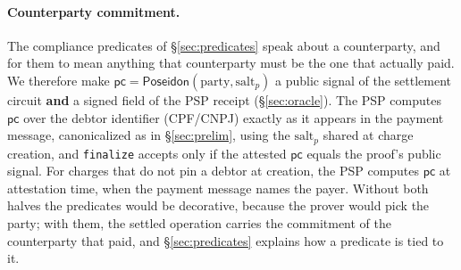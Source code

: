 \documentclass[11pt]{article}
\newcommand{\Poseidon}{\ensuremath{\mathsf{Poseidon}}}
\newcommand{\code}[1]{\texttt{#1}}
\begin{document}
\paragraph{Counterparty commitment.}
The compliance predicates of \S\ref{sec:predicates} speak about a counterparty,
and for them to mean anything that counterparty must be the one that actually
paid. We therefore make $\mathsf{pc}=\Poseidon(\text{party},\text{salt}_p)$ a
public signal of the settlement circuit \textbf{and} a signed field of the PSP
receipt (\S\ref{sec:oracle}). The PSP computes $\mathsf{pc}$ over the debtor
identifier (CPF/CNPJ) exactly as it appears in the payment message,
canonicalized as in \S\ref{sec:prelim}, using the $\text{salt}_p$ shared at
charge creation, and \code{finalize} accepts only if the attested $\mathsf{pc}$
equals the proof's public signal. For charges that do not pin a debtor at
creation, the PSP computes $\mathsf{pc}$ at attestation time, when the payment
message names the payer. Without both halves the predicates would be
decorative, because the prover would pick the party; with them, the settled
operation carries the commitment of the counterparty that paid, and
\S\ref{sec:predicates} explains how a predicate is tied to it.
\end{document}
